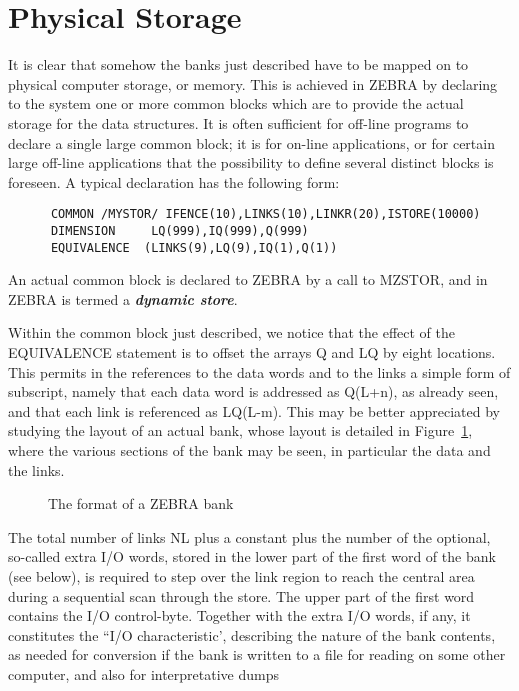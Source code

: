 \section{Physical Storage}
\par It is clear that somehow the banks just described have to be mapped on
to physical computer storage, or memory.
This is achieved in ZEBRA by declaring to the system one or more common
blocks which are to provide the actual storage for the data structures.
It is often sufficient for off-line programs to declare a single large
common block; it is for on-line applications, or for certain large
off-line applications that the possibility to define several distinct
blocks is foreseen. A typical declaration has the following form:
\begin{verbatim}
      COMMON /MYSTOR/ IFENCE(10),LINKS(10),LINKR(20),ISTORE(10000)
      DIMENSION     LQ(999),IQ(999),Q(999)
      EQUIVALENCE  (LINKS(9),LQ(9),IQ(1),Q(1))
\end{verbatim}
An actual common block is declared to ZEBRA by a call to MZSTOR,
and in ZEBRA is termed a {\bf\it dynamic store}.
\par
Within the common block just described, we notice that the effect of the
EQUIVALENCE statement is to offset the arrays Q and LQ by eight
locations. This permits in the references to the data words and to the
links a simple form of subscript, namely that each data word is
addressed as Q(L+n), as already seen, and that each link is referenced
as LQ(L-m). This may be better appreciated by studying the layout of an
actual bank, whose layout is detailed in Figure~\ref{BNKFORM},
where the various sections of the bank may be seen, in particular the
data and the links.
\begin{figure}
\caption{The format of a ZEBRA bank}
\label{BNKFORM}
\end{figure}
\par
The total number of links NL plus a constant plus the number of the
optional, so-called extra I/O words, stored
in the lower part of the first word of the bank (see below),
is required to step over the link
region to reach the central area during a sequential scan
through the store.
The upper part of the first word contains the I/O control-byte.
Together with the extra I/O words, if any, it constitutes the
``I/O characteristic', describing the nature of the bank contents,
as needed for conversion if the bank is written to a file for reading
on some other computer, and also for interpretative dumps
